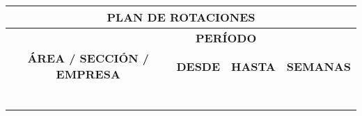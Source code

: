 \begin{table}[ht]
    \centering
    \renewcommand{\arraystretch}{2}
    \begin{tabular}{|llll|}
        \hline
        \multicolumn{4}{|c|}{\cellcolor[HTML]{C0C0C0}\textbf{PLAN DE ROTACIONES}}                                                                                                                                         \\ \hline
        \multicolumn{1}{|c|}{}                                                    & \multicolumn{2}{c|}{\textbf{PERÍODO}} & \multicolumn{1}{c|}{}                                                                         \\ \cline{2-3}
        \multicolumn{1}{|c|}{\multirow{-2}{*}{\textbf{ÁREA / SECCIÓN / EMPRESA}}} & \multicolumn{1}{c|}{\textbf{DESDE}}   & \multicolumn{1}{c|}{\textbf{HASTA}} & \multicolumn{1}{c|}{\multirow{-2}{*}{\textbf{SEMANAS}}} \\ \hline
        \multicolumn{1}{|l|}{}                                                    & \multicolumn{1}{l|}{}                 & \multicolumn{1}{l|}{}               &                                                         \\ \hline
        \multicolumn{1}{|l|}{}                                                    & \multicolumn{1}{l|}{}                 & \multicolumn{1}{l|}{}               &                                                         \\ \hline
        \multicolumn{1}{|l|}{}                                                    & \multicolumn{1}{l|}{}                 & \multicolumn{1}{l|}{}               &                                                         \\ \hline
        \multicolumn{1}{|l|}{}                                                    & \multicolumn{1}{l|}{}                 & \multicolumn{1}{l|}{}               &                                                         \\ \hline
        \multicolumn{1}{|l|}{}                                                    & \multicolumn{1}{l|}{}                 & \multicolumn{1}{l|}{}               &                                                         \\ \hline
        \multicolumn{1}{|l|}{}                                                    & \multicolumn{1}{l|}{}                 & \multicolumn{1}{l|}{}               &                                                         \\ \hline

\end{tabular}
\end{table}
